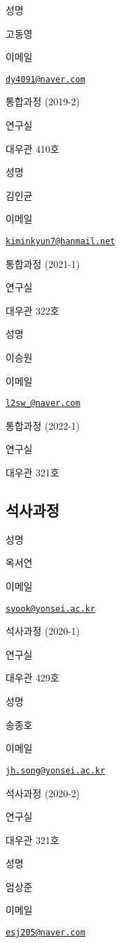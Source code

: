 \documentclass[
]{book}
\begin{document}
성명

고동영

이메일

\href{mailto:dy4091@naver.com}{\nolinkurl{dy4091@naver.com}}

통합과정 (2019-2)

연구실

대우관 410호

성명

김인균

이메일

\href{mailto:kiminkyun7@hanmail.net}{\nolinkurl{kiminkyun7@hanmail.net}}

통합과정 (2021-1)

연구실

대우관 322호

성명

이승원

이메일

\href{mailto:l2sw_@naver.com}{\nolinkurl{l2sw\_@naver.com}}

통합과정 (2022-1)

연구실

대우관 321호

\hypertarget{uxc11duxc0acuxacfcuxc815}{%
\subsection*{석사과정}\label{uxc11duxc0acuxacfcuxc815}}

성명

옥서연

이메일

\href{mailto:syook@yonsei.ac.kr}{\nolinkurl{syook@yonsei.ac.kr}}

석사과정 (2020-1)

연구실

대우관 429호

성명

송종호

이메일

\href{mailto:jh.song@yonsei.ac.kr}{\nolinkurl{jh.song@yonsei.ac.kr}}

석사과정 (2020-2)

연구실

대우관 321호

성명

엄상준

이메일

\href{mailto:esj205@naver.com}{\nolinkurl{esj205@naver.com}}
\end{document}
